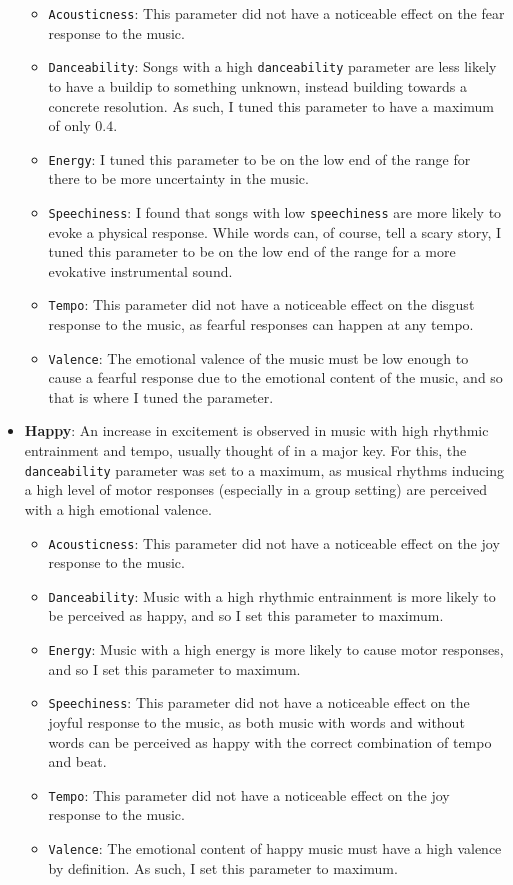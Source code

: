 \documentclass{article}
\renewcommand{\_}[1]{\underline{ #1 }}
\theoremstyle{definition}
\begin{document}
\begin{itemize}
        \begin{itemize}
            \item \texttt{Acousticness}: This parameter did not have a noticeable effect on the fear response to the music. 
            \item \texttt{Danceability}: Songs with a high \texttt{danceability} parameter are less likely to have a buildip to something unknown, instead building towards a concrete resolution. As such, I tuned this parameter to have a maximum of only $0.4$. 
            \item \texttt{Energy}: I tuned this parameter to be on the low end of the range for there to be more uncertainty in the music. 
            \item \texttt{Speechiness}: I found that songs with low \texttt{speechiness} are more likely to evoke a physical response. While words can, of course, tell a scary story, I tuned this parameter to be on the low end of the range for a more evokative instrumental sound.
            \item \texttt{Tempo}: This parameter did not have a noticeable effect on the disgust response to the music, as fearful responses can happen at any tempo.
            \item \texttt{Valence}: The emotional valence of the music must be low enough to cause a fearful response due to the emotional content of the music, and so that is where I tuned the parameter.
        \end{itemize}

    \item \textbf{Happy}: An increase in excitement is observed in music with high rhythmic entrainment and tempo, usually thought of in a major key. For this, the \texttt{danceability} parameter was set to a maximum, as musical rhythms inducing a high level of motor responses (especially in a group setting) are perceived with a high emotional valence.

        \begin{itemize}
            \item \texttt{Acousticness}: This parameter did not have a noticeable effect on the joy response to the music. 
            \item \texttt{Danceability}: Music with a high rhythmic entrainment is more likely to be perceived as happy, and so I set this parameter to maximum.
            \item \texttt{Energy}: Music with a high energy is more likely to cause motor responses, and so I set this parameter to maximum.
            \item \texttt{Speechiness}: This parameter did not have a noticeable effect on the joyful response to the music, as both music with words and without words can be perceived as happy with the correct combination of tempo and beat.
            \item \texttt{Tempo}: This parameter did not have a noticeable effect on the joy response to the music. 
            \item \texttt{Valence}: The emotional content of happy music must have a high valence by definition. As such, I set this parameter to maximum.
        \end{itemize}


\end{itemize}
\end{document}
